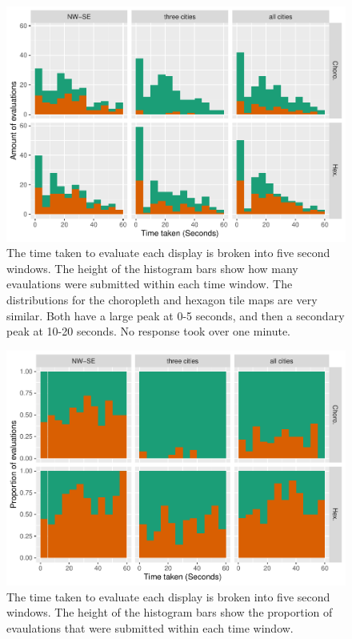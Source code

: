 \documentclass[conference,final,]{IEEEtran}
\makeatletter
\def\maxwidth{\ifdim\Gin@nat@width>\linewidth\linewidth
\else\Gin@nat@width\fi}
\let\Oldincludegraphics\includegraphics
\renewcommand{\includegraphics}[1]{\Oldincludegraphics[width=\maxwidth]{#1}}
\makeatother
\begin{document}
\begin{figure}
\centering
\includegraphics{paper_files/figure-latex/hist_height-1.pdf}
\caption{The time taken to evaluate each display is broken into five
second windows. The height of the histogram bars show how many
evaulations were submitted within each time window. The distributions
for the choropleth and hexagon tile maps are very similar. Both have a
large peak at 0-5 seconds, and then a secondary peak at 10-20 seconds.
No response took over one minute.}
\end{figure}

\begin{figure}
\centering
\includegraphics{paper_files/figure-latex/hist_fill-1.pdf}
\caption{The time taken to evaluate each display is broken into five
second windows. The height of the histogram bars show the proportion of
evaulations that were submitted within each time window.}
\end{figure}
\end{document}
